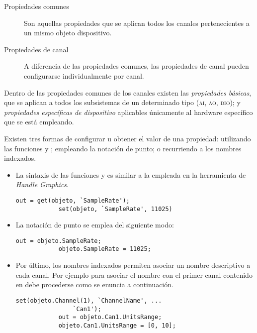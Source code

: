 \begin{description}
	\item[Propiedades comunes] Son aquellas propiedades que se aplican
		todos los canales pertenecientes a un mismo objeto
		dispositivo.
	\item[Propiedades de canal] A diferencia de las propiedades
		comunes, las propiedades de canal pueden configurarse
		individualmente por canal.
\end{description}

Dentro de las propiedades comunes de los canales existen las
\emph{propiedades básicas}, que se aplican a todos los subsistemas de un
determinado tipo (\textsc{ai, ao, dio}); y \emph{propiedades específicas de
dispositivo} aplicables únicamente al hardware específico que se está
empleando.

Existen tres formas de configurar u obtener el valor de una propiedad:
utilizando las funciones  y ; empleando la notación de
punto; o recurriendo a los nombres indexados.

\begin{itemize}
	\item La sintaxis de las funciones  y  es
		similar a la empleada en la herramienta de \matlab{}
		\emph{Handle Graphics}.

		\begin{lstlisting}[gobble=16]
			out = get(objeto, `SampleRate');
			set(objeto, `SampleRate', 11025)
		\end{lstlisting}

	\item La notación de punto se emplea del siguiente modo:

		\begin{lstlisting}[gobble=16]
			out = objeto.SampleRate;
			objeto.SampleRate = 11025;
		\end{lstlisting}

	\item Por último, los nombres indexados permiten asociar un nombre
		descriptivo a cada canal. Por ejemplo para asociar el
		nombre  con el primer canal contenido en
		 debe procederse como se enuncia a
		continuación.

		\begin{lstlisting}[gobble=16]
			set(objeto.Channel(1), `ChannelName', ...
				`Can1');
			out = objeto.Can1.UnitsRange;
			objeto.Can1.UnitsRange = [0, 10];
		\end{lstlisting}

\end{itemize}


